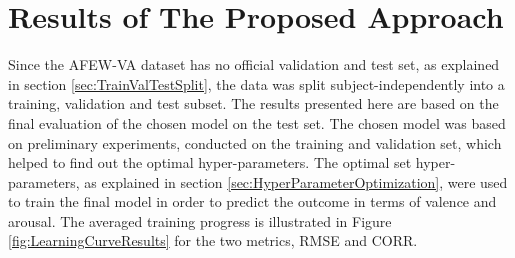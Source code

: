 \section{Results of The Proposed Approach} \label{sec:ResultsProposedApproach}
Since the AFEW-VA dataset has no official validation and test set, as explained in section \ref{sec:TrainValTestSplit}, the data was split subject-independently into a training, validation and test subset. The results presented here are based on the final evaluation of the chosen model on the test set. The chosen model was based on preliminary experiments, conducted on the training and validation set, which helped to find out the optimal hyper-parameters.
\newline\newline
The optimal set hyper-parameters, as explained in section \ref{sec:HyperParameterOptimization}, were used to train the final model in order to predict the outcome in terms of valence and arousal. The averaged training progress is illustrated in Figure \ref{fig:LearningCurveResults} for the two metrics, RMSE and CORR.
\newline 

